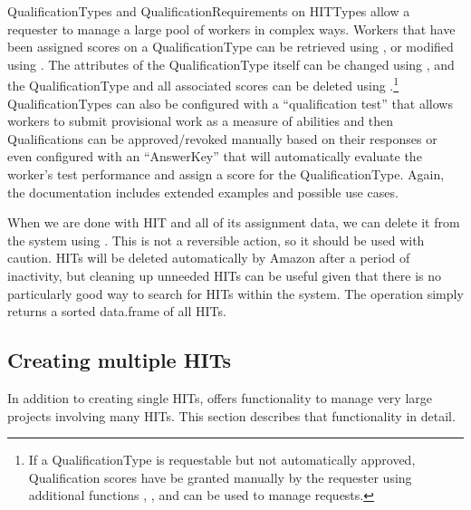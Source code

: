 QualificationTypes and QualificationRequirements on HITTypes allow a requester to manage a large pool of workers in complex ways. Workers that have been assigned scores on a QualificationType can be retrieved using , or modified using . The attributes of the QualificationType itself can be changed using , and the QualificationType and all associated scores can be deleted using .\footnote{If a QualificationType is requestable but not automatically approved, Qualification scores have be granted manually by the requester using additional functions , , and  can be used to manage requests.} QualificationTypes can also be configured with a ``qualification test'' that allows workers to submit provisional work as a measure of abilities and then Qualifications can be approved/revoked manually based on their responses or even configured with an ``AnswerKey'' that will automatically evaluate the worker's test performance and assign a score for the QualificationType. Again, the  documentation includes extended examples and possible use cases.

When we are done with HIT and all of its assignment data, we can delete it from the system using . This is not a reversible action, so it should be used with caution. HITs will be deleted automatically by Amazon after a period of inactivity, but cleaning up unneeded HITs can be useful given that there is no particularly good way to search for HITs within the system. The  operation simply returns a sorted data.frame of all HITs.


\subsection{Creating multiple HITs}

In addition to creating single HITs,  offers functionality to manage very large projects involving many HITs. This section describes that functionality in detail.


